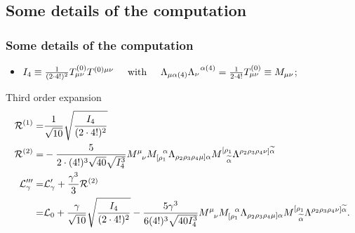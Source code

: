 \documentclass{beamer}
\begin{document}
\subsection{Some details of the computation}
\begin{frame}[fragile]
\frametitle{Some details of the computation}

\begin{itemize}
\item $I_4\equiv \frac{1}{(2\cdot4!)^2}T^{(0)}_{\mu\nu}T^{(0)\mu\nu}\hspace{0.5cm}\text{with}\hspace{0.5cm} \Lambda_{\mu\alpha(4)}\Lambda_{\nu}^{\hspace{0.2cm}\alpha(4)}=\frac{1}{2\cdot4!}T_{\mu\nu}^{(0)}\equiv M_{\mu\nu}$;
\end{itemize}

\vspace{0.2cm}
\scriptsize
\begin{block}{Third order expansion}
\begin{align*}
    \mathcal{R}^{(1)}=&\frac{1}{\sqrt{10}}\sqrt{\frac{I_4}{(2\cdot 4!)^2}}\\
    \mathcal{R}^{(2)}=&-\frac{5}{2\cdot(4!)^3\sqrt{40}\sqrt{I^3_4}}M^{\mu}_{\hspace{0.2cm}\nu}M^{\hspace{0.2cm}\alpha}_{[\rho_1}\Lambda_{\rho_2\rho_3\rho_4\mu]\alpha}M^{[\rho_1}_{\hspace{0.2cm}\widetilde\alpha}\Lambda^{\rho_2\rho_3\rho_4\nu]\widetilde\alpha}\\
    \mathcal{L}'''_\gamma=&\mathcal{L}'_\gamma+\frac{\gamma^3}{3}\mathcal{R}^{(2)}\\
    =&\mathcal{L}_0+\frac{\gamma}{\sqrt{10}}\sqrt{\frac{I_4}{(2\cdot 4!)^2}}-\frac{5\gamma^3}{6(4!)^3\sqrt{40I^3_4}}M^{\mu}_{\hspace{0.2cm}\nu}M^{\hspace{0.2cm}\alpha}_{[\rho_1}\Lambda_{\rho_2\rho_3\rho_4\mu]\alpha}M^{[\rho_1}_{\hspace{0.2cm}\widetilde\alpha}\Lambda^{\rho_2\rho_3\rho_4\nu]\widetilde\alpha}.
\end{align*}
\end{block}

\vspace{0.1cm}


\end{frame}
\end{document}
